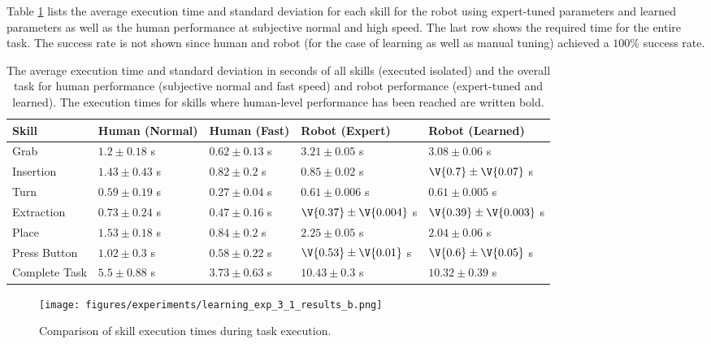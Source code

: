 Table \ref{tab:learning:exp_3_1:comparison} lists the average execution time and standard deviation for each skill for the robot using expert-tuned parameters and learned parameters as well as the human performance at subjective normal and high speed.
The last row shows the required time for the entire task.
The success rate is not shown since human and robot (for the case of learning as well as manual tuning) achieved a $100 \%$ success rate.
\renewcommand{\arraystretch}{1.2}
\begin{table}[ht!]
\begin{center}
\caption{The average execution time and standard deviation in seconds of all skills (executed isolated) and the overall task for human performance (subjective normal and fast speed) and robot performance (expert-tuned and learned). The execution times for skills where human-level performance has been reached are written bold.}
\label{tab:learning:exp_3_1:comparison}
\begin{tabular}{|l|p{2.3cm}|p{2.3cm}|p{2.7cm}|p{2.7cm}|}
\hline 
Skill & Human (Normal) & Human (Fast) & Robot \nohyphens{(Expert)} & Robot (Learned) \\ 
\hline 
Grab & $1.2 \pm 0.18$ s & $0.62 \pm 0.13$ s & $3.21 \pm 0.05$ s & $3.08 \pm 0.06$ s \\ 
\hline 
Insertion & $1.43 \pm 0.43$ s& $0.82 \pm 0.2$ s& $0.85 \pm 0.02$ s& $\V{0.7} \pm \V{0.07}$ s\\ 
\hline 
Turn & $0.59 \pm 0.19$ s & $0.27 \pm 0.04$ s& $0.61 \pm 0.006$ s& $0.61 \pm 0.005$ s\\ 
\hline 
Extraction & $0.73 \pm 0.24$ s& $0.47 \pm 0.16$ s & $\V{0.37} \pm \V{0.004}$ s& $\V{0.39} \pm \V{0.003}$ s\\ 
\hline 
Place & $1.53 \pm 0.18$ s& $0.84 \pm 0.2$ s& $2.25 \pm 0.05$ s& $2.04 \pm 0.06$ s\\ 
\hline 
Press Button & $1.02 \pm 0.3$ s& $0.58 \pm 0.22$ s& $\V{0.53} \pm \V{0.01}$ s& $\V{0.6} \pm \V{0.05}$ s\\ 
\hline 
Complete Task & $5.5 \pm 0.88$ s& $3.73 \pm 0.63$ s& $10.43 \pm 0.3$ s& $10.32 \pm 0.39$ s\\
\hline
\end{tabular}
\end{center}
\end{table}

\begin{figure}[ht!]
\texttt{[image: figures/experiments/learning\_exp\_3\_1\_results\_b.png]}
\caption{Comparison of skill execution times during task execution.}
\label{fig:learning:exp_3_1:results_b}
\end{figure}

